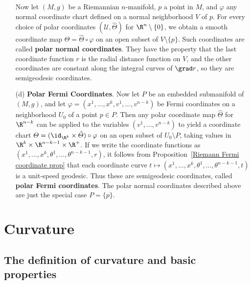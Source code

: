 \begin{example}
\begin{itemize}
Now let $(M,g)$ be a Riemannian $n$-manifold, $p$ a point in $M$, and $\varphi$ any normal coordinate chart defined on a normal neighborhood $V$ of $p$. For every 
choice of polar coordinates $(\mathcal{U},\hat{\varTheta})$ for $\R^n\setminus\{0\}$, we obtain a smooth coordinate map $\varTheta=\hat{\varTheta}\circ\varphi$ on an open subset of $V\setminus\{p\}$. Such coordinates are called \textbf{polar normal coordinates}. They have the property that the last coordinate function $r$ is the radial distance function on $V$, and the other coordinates are constant along the integral curves of $\grad r$, so they are semigeodesic coordinates.
\item[(d)] \textbf{Polar Fermi Coordinates}. Now let $P$ be an embedded submanifold of $(M,g)$, and let $\varphi=(x^1,\dots,x^k,v^1,\dots,v^{n-k})$ be Fermi coordinates on a neighborhood $U_0$ of a point $p\in P$. Then any polar coordinate map $\hat{\varTheta}$ for $\R^{n-k}$ can be applied to the variables $(v^1,\dots,v^{n-k})$ to yield a coordinate chart $\varTheta=(\id_{\R^k}\times\hat{\varTheta})\circ\varphi$ on an open subset of $U_0\setminus P$, taking values in $\R^k\times\R^{n-k-1}\times\R^+$. If we write the coordinate functions as $(x^1,\dots,x^k,\theta^1,\dots,\theta^{n-k-1},r)$, it follows from Proposition~\ref{Riemann Fermi coordinate prop} that each coordinate curve $t\mapsto(x^1,\dots,x^k,\theta^1,\dots,\theta^{n-k-1},t)$ is a unit-speed geodesic. Thus these are semigeodesic coordinates, called \textbf{polar Fermi coordinates}. The polar normal coordinates described above are just the special case $P=\{p\}$.
\end{itemize}
\end{example}
\chapter{Curvature}
\section{The definition of curvature and basic properties}
